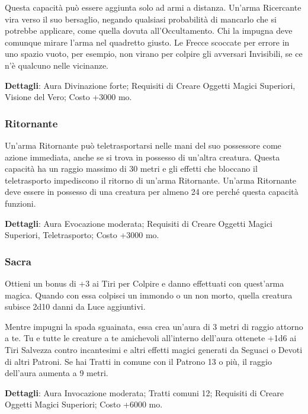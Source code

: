 \begin{multicols}{2}
Questa capacità può essere aggiunta solo ad armi a distanza. Un'arma Ricercante vira verso il suo bersaglio, negando qualsiasi probabilità di mancarlo che si potrebbe applicare, come quella dovuta all'Occultamento. Chi la impugna deve comunque mirare l'arma nel quadretto giusto. Le Frecce scoccate per errore in uno spazio vuoto, per esempio, non virano per colpire gli avversari Invisibili, se ce n'è qualcuno nelle vicinanze.

\textbf{Dettagli}: Aura Divinazione forte; Requisiti di Creare Oggetti Magici Superiori, Visione del Vero; Costo +3000 mo.

\subsubsection*{Ritornante}

Un'arma Ritornante può teletrasportarsi nelle mani del suo possessore come azione immediata, anche se si trova in possesso di un'altra creatura. Questa capacità ha un raggio massimo di 30 metri e gli effetti che bloccano il teletrasporto impediscono il ritorno di un'arma Ritornante. Un'arma Ritornante deve essere in possesso di una creatura per almeno 24 ore perché questa capacità funzioni.

\textbf{Dettagli}: Aura Evocazione moderata; Requisiti di Creare Oggetti Magici Superiori, Teletrasporto; Costo +3000 mo.

\subsubsection*{Sacra}

Ottieni un bonus di +3 ai Tiri per Colpire e danno effettuati con quest'arma magica. Quando con essa colpisci un immondo o un non morto, quella creatura subisce 2d10 danni da Luce aggiuntivi.

Mentre impugni la spada sguainata, essa crea un'aura di 3 metri di raggio attorno a te. Tu e tutte le creature a te amichevoli all'interno dell'aura ottenete +1d6 ai Tiri Salvezza contro incantesimi e altri effetti magici generati da Seguaci o Devoti di altri Patroni. Se hai Tratti in comune con il Patrono 13 o più, il raggio dell'aura aumenta a 9 metri.

\textbf{Dettagli}: Aura Invocazione moderata; Tratti comuni 12; Requisiti di Creare Oggetti Magici Superiori; Costo +6000 mo.




\end{multicols}
